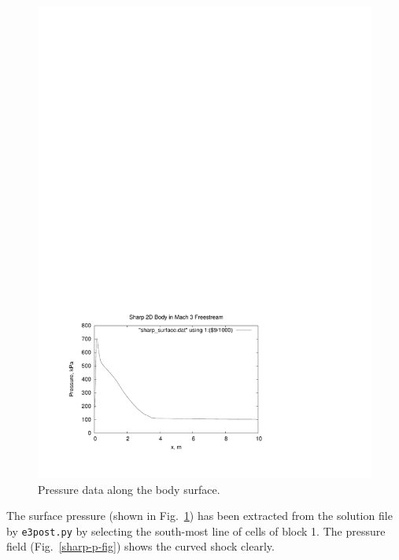 \begin{figure}[htbp]
\begin{center}
\includegraphics[width=12cm, viewport=55 49 401 292]{../2D/sharp/sharp_surface_p.pdf}
\end{center}
\caption{Pressure data along the body surface.}
\label{sharp-surface-pressure-fig}
\end{figure}

\medskip
The surface pressure (shown in Fig.~\ref{sharp-surface-pressure-fig})
has been extracted from the solution file by \texttt{e3post.py} by selecting the
south-most line of cells of block 1.
The pressure field (Fig.~\ref{sharp-p-fig}) shows the curved shock clearly.

